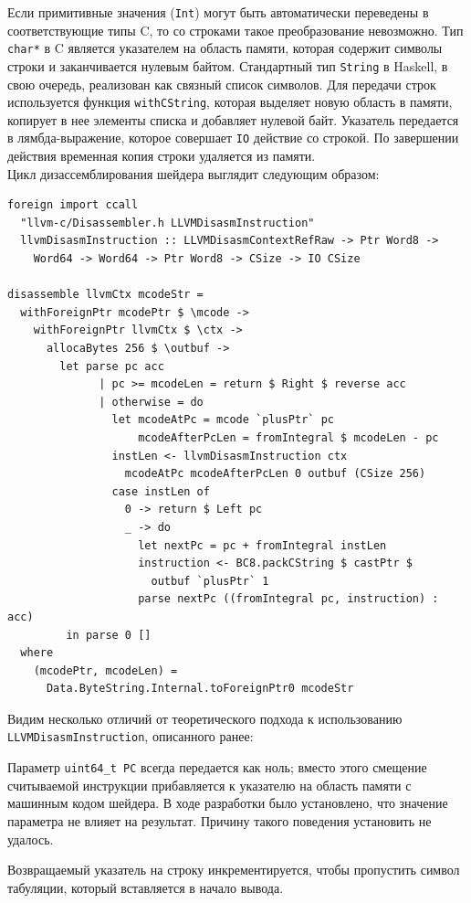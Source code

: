 \documentclass[a4paper,14pt]{extarticle}
\begin{document}
{Если примитивные значения (\verb|Int|) могут быть автоматически переведены
в соответствующие типы C, то со строками такое преобразование невозможно.
Тип \verb|char*| в C является указателем на область памяти, которая содержит символы
строки и заканчивается нулевым байтом. Стандартный тип \verb|String| в Haskell,
в свою очередь, реализован как связный список символов. Для передачи строк
используется функция \verb|withCString|, которая выделяет новую область в памяти,
копирует в нее элементы списка и добавляет нулевой байт. Указатель передается
в лямбда-выражение, которое совершает \verb|IO| действие со строкой. По завершении
действия временная копия строки удаляется из памяти.\\

Цикл дизассемблирования шейдера выглядит следующим образом:

\begin{verbatim}
foreign import ccall
  "llvm-c/Disassembler.h LLVMDisasmInstruction"
  llvmDisasmInstruction :: LLVMDisasmContextRefRaw -> Ptr Word8 ->
    Word64 -> Word64 -> Ptr Word8 -> CSize -> IO CSize

disassemble llvmCtx mcodeStr =
  withForeignPtr mcodePtr $ \mcode ->
    withForeignPtr llvmCtx $ \ctx ->
      allocaBytes 256 $ \outbuf ->
        let parse pc acc
              | pc >= mcodeLen = return $ Right $ reverse acc
              | otherwise = do
                let mcodeAtPc = mcode `plusPtr` pc
                    mcodeAfterPcLen = fromIntegral $ mcodeLen - pc
                instLen <- llvmDisasmInstruction ctx
                  mcodeAtPc mcodeAfterPcLen 0 outbuf (CSize 256)
                case instLen of
                  0 -> return $ Left pc
                  _ -> do
                    let nextPc = pc + fromIntegral instLen
                    instruction <- BC8.packCString $ castPtr $
                      outbuf `plusPtr` 1
                    parse nextPc ((fromIntegral pc, instruction) : acc)
         in parse 0 []
  where
    (mcodePtr, mcodeLen) =
      Data.ByteString.Internal.toForeignPtr0 mcodeStr
\end{verbatim}

Видим несколько отличий от теоретического подхода к использованию
\verb|LLVMDisasmInstruction|, описанного ранее:
\begin{ol}
\item Параметр \verb|uint64_t PC| всегда передается как ноль; вместо этого
смещение считываемой инструкции прибавляется к указателю на область памяти
с машинным кодом шейдера. В ходе разработки было установлено, что значение
параметра не влияет на результат. Причину такого поведения установить не удалось.
\item Возвращаемый указатель на строку инкрементируется, чтобы пропустить
символ табуляции, который вставляется в начало вывода.
\end{ol}

}
\end{document}
